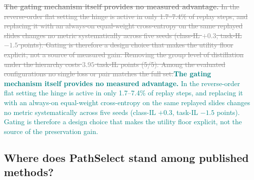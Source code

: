 \documentclass{article}
\newif\ifmarkup \markuptrue
\newcommand{\repc}[3]{\ifmarkup\textcolor{gray}{\sout{#2}}\textcolor{#1}{#3}\else#3\fi}
\newcommand{\repG}[2]{\repc{teal}{#1}{#2}}    %
\begin{document}
\repG{\textbf{The gating mechanism itself provides no measured advantage.} In the reverse-order flat setting the hinge is active in only 1.7--7.4\% of replay steps, and replacing it with an always-on equal-weight cross-entropy on the same replayed slides changes no metric systematically across five seeds (class-IL $+0.3$, task-IL $-1.5$ points). Gating is therefore a design choice that makes the utility floor explicit, not a source of measured gain. Removing the group level of distillation under the hierarchy costs $3.95$ task-IL points (5/5). Among the evaluated configurations no single loss or pair matches the full set.}{\textbf{The gating mechanism itself provides no measured advantage.} In the reverse-order flat setting the hinge is active in only 1.7--7.4\% of replay steps, and replacing it with an always-on equal-weight cross-entropy on the same replayed slides changes no metric systematically across five seeds (class-IL $+0.3$, task-IL $-1.5$ points). Gating is therefore a design choice that makes the utility floor explicit, not the source of the preservation gain.}

\subsection{Where does PathSelect stand among published methods?}
\label{ssec:sota}
\end{document}
